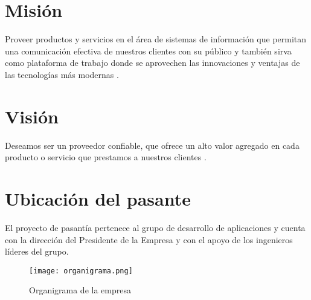 \section{Misión}
Proveer productos y servicios en el área de sistemas de información que permitan una comunicación efectiva de nuestros clientes con su público y también sirva como plataforma de trabajo donde se aprovechen las innovaciones y ventajas de las tecnologías más modernas \cite{ikelsAbout}.

\section{Visión}
Deseamos ser un proveedor confiable, que ofrece un alto valor agregado en cada producto o servicio que prestamos a nuestros clientes \cite{ikelsAbout}.

\section{Ubicación del pasante}
El proyecto de pasantía pertenece al grupo de desarrollo de aplicaciones y cuenta con la dirección del Presidente de la Empresa y con el apoyo de los ingenieros líderes del grupo.

\begin{figure}[H]
\centering
    \texttt{[image: organigrama.png]}
    \caption{Organigrama de la empresa}
    \label{fig:organigrama}
\end{figure}